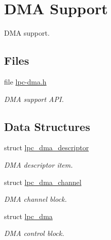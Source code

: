 \hypertarget{group__lpc__dma}{}\section{D\+MA Support}
\label{group__lpc__dma}


D\+MA support.  


\subsection*{Files}
\begin{DoxyCompactItemize}
\item 
file \mbox{\hyperlink{lpc-dma_8h}{lpc-\/dma.\+h}}
\begin{DoxyCompactList}\small\item\em D\+MA support A\+PI. \end{DoxyCompactList}\end{DoxyCompactItemize}
\subsection*{Data Structures}
\begin{DoxyCompactItemize}
\item 
struct \mbox{\hyperlink{structlpc__dma__descriptor}{lpc\+\_\+dma\+\_\+descriptor}}
\begin{DoxyCompactList}\small\item\em D\+MA descriptor item. \end{DoxyCompactList}\item 
struct \mbox{\hyperlink{structlpc__dma__channel}{lpc\+\_\+dma\+\_\+channel}}
\begin{DoxyCompactList}\small\item\em D\+MA channel block. \end{DoxyCompactList}\item 
struct \mbox{\hyperlink{structlpc__dma}{lpc\+\_\+dma}}
\begin{DoxyCompactList}\small\item\em D\+MA control block. \end{DoxyCompactList}\end{DoxyCompactItemize}
